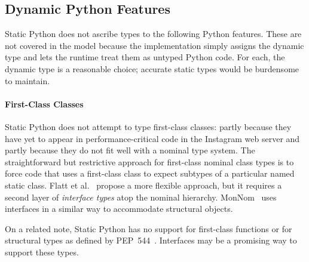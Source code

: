 \documentclass[english,cleveref,crc]{programming}
\newcommand{\SP}{Static Python}
\begin{document}
\subsection{Dynamic Python Features}
\label{s:dynamic-python}


\SP{} does not ascribe types to the following Python features.
These are not covered in the model because the implementation simply
assigns the dynamic type and lets the runtime treat them as untyped
Python code.
For each, the dynamic type is a reasonable choice;
accurate static types would be burdensome to maintain.


\paragraph{First-Class Classes}

\SP{} does not attempt to type first-class classes: partly because they have
yet to appear in performance-critical code in the Instagram web server
and partly because they do not fit well with a nominal type system.
The straightforward but restrictive approach for first-class nominal class types
is to force code that uses a first-class class to expect subtypes of a
particular named static class.
Flatt et al.~\cite{fkf-popl-1998} propose a more flexible approach, %
but it requires a second layer of \emph{interface types} atop the nominal hierarchy.
MonNom~\cite{mt-oopsla-2021} uses interfaces in a similar way to accommodate
structural objects.

On a related note, \SP{} has no support for first-class functions or for
structural types as defined by PEP~544~\cite{pep544}.
Interfaces may be a promising way to support these types.


\end{document}
